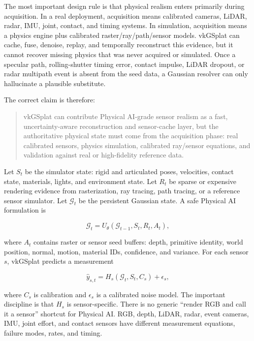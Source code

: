\documentclass[11pt]{article}
\begin{document}
The most important design rule is that physical realism enters primarily during
acquisition. In a real deployment, acquisition means calibrated cameras, LiDAR,
radar, IMU, joint, contact, and timing systems. In simulation, acquisition means
a physics engine plus calibrated raster/ray/path/sensor models. vkGSplat can
cache, fuse, denoise, replay, and temporally reconstruct this evidence, but it
cannot recover missing physics that was never acquired or simulated. Once a
specular path, rolling-shutter timing error, contact impulse, LiDAR dropout, or
radar multipath event is absent from the seed data, a Gaussian resolver can only
hallucinate a plausible substitute.

The correct claim is therefore:

\begin{quote}
vkGSplat can contribute Physical AI-grade sensor realism as a fast,
uncertainty-aware reconstruction and sensor-cache layer, but the authoritative
physical state must come from the acquisition phase: real calibrated sensors,
physics simulation, calibrated ray/sensor equations, and validation against real
or high-fidelity reference data.
\end{quote}

Let $S_t$ be the simulator state: rigid and articulated poses, velocities,
contact state, materials, lights, and environment state. Let $R_t$ be sparse or
expensive rendering evidence from rasterization, ray tracing, path tracing, or a
reference sensor simulator. Let $\mathcal G_t$ be the persistent Gaussian state.
A safe Physical AI formulation is

\[
  \mathcal G_t = U_\theta(\mathcal G_{t-1}, S_t, R_t, A_t),
\]

where $A_t$ contains raster or sensor seed buffers: depth, primitive identity,
world position, normal, motion, material IDs, confidence, and variance. For each
sensor $s$, vkGSplat predicts a measurement

\[
  \hat y_{s,t} = H_s(\mathcal G_t, S_t, C_s) + \epsilon_s,
\]

where $C_s$ is calibration and $\epsilon_s$ is a calibrated noise model. The
important discipline is that $H_s$ is sensor-specific. There is no generic
``render RGB and call it a sensor'' shortcut for Physical AI. RGB, depth, LiDAR,
radar, event cameras, IMU, joint effort, and contact sensors have different
measurement equations, failure modes, rates, and timing.
\end{document}
